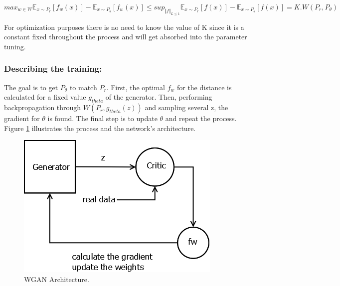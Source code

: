 \begin{equation}
	max_{w \in W} \mathbb{E}_{x \sim P_{r}}[f_{w}(x)] - \mathbb{E}_{x \sim P_{\theta}}[f_{w}(x)] \leq sup_{\Vert f \Vert_{L \leq 1}} \mathbb{E}_{x \sim P_{r}}[f(x)] - \mathbb{E}_{x \sim P_{\theta}}[f(x)] = K . W(P_{r}, P_{\theta})
\end{equation}

For optimization purposes there is no need to know the value of K since it is a constant fixed throughout the process and will get absorbed into the parameter tuning.
\subsubsection {Describing the training:}

The goal is to get $P_{\theta}$ to match $P_{r}$. First, the optimal $f_{w}$ for the distance is calculated for a fixed value $g_{theta}$ of the generator. Then,  performing  backpropagation through $W(P_{r}, g_{theta}(z))$ and sampling several z, the gradient for $\theta$ is found. The final step is to update $\theta$ and repeat the process. Figure \ref{fig:wgan} illustrates the process and the network's architecture. 

\begin{figure}[h!]
	\centering
	\includegraphics[scale=0.4]{media/WGAN.png}
	\caption{WGAN Architecture.} 
	\label{fig:wgan}
\end{figure}

